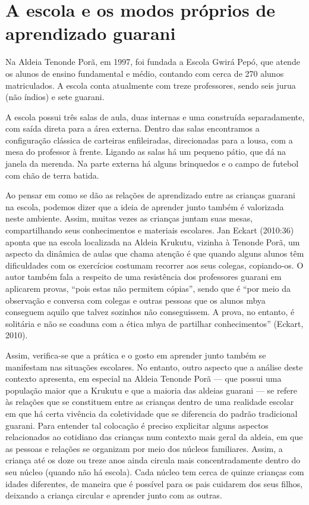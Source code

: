 \section{A escola e os modos próprios de aprendizado guarani}

Na Aldeia Tenonde Porã, em 1997, foi fundada a Escola Gwirá Pepó, que
atende os alunos de ensino fundamental e médio, contando com cerca de
270 alunos matriculados. A escola conta atualmente com treze
professores, sendo seis jurua (não índios) e sete guarani.

A escola possui três salas de aula, duas internas e uma construída
separadamente, com saída direta para a área externa. Dentro das salas
encontramos a configuração clássica de carteiras enfileiradas,
direcionadas para a lousa, com a mesa do professor à frente. Ligando as
salas há um pequeno pátio, que dá na janela da merenda. Na parte
externa há alguns brinquedos e o campo de futebol com chão de terra
batida. 

Ao pensar em como se dão as relações de aprendizado entre as crianças
guarani na escola, podemos dizer que a ideia de aprender junto também é
valorizada neste ambiente. Assim, muitas vezes as crianças juntam suas
mesas, compartilhando seus conhecimentos e materiais escolares. Jan
Eckart (2010:36) aponta que na escola localizada na Aldeia Krukutu,
vizinha à Tenonde Porã, um aspecto da dinâmica de aulas que chama
atenção é que quando alguns alunos têm dificuldades com os exercícios
costumam recorrer aos seus colegas, copiando-os. O autor também fala a
respeito de uma resistência dos professores guarani em aplicarem
provas, ``pois estas não permitem cópias'', sendo que é ``por meio da
observação e conversa com colegas e outras pessoas que os alunos mbya
conseguem aquilo que talvez sozinhos não conseguissem. A prova, no
entanto, é solitária e não se coaduna com a ética mbya de partilhar
conhecimentos'' (Eckart, 2010).

Assim, verifica-se que a prática e o gosto em aprender junto também se
manifestam nas situações escolares. No entanto, outro aspecto que a
análise deste contexto apresenta, em especial na Aldeia Tenonde Porã —
que possui uma população maior que a Krukutu e que a maioria das
aldeias guarani — se refere às relações que se constituem entre as
crianças dentro de uma realidade escolar em que há certa vivência da
coletividade que se diferencia do padrão tradicional guarani. Para
entender tal colocação é preciso explicitar alguns aspectos
relacionados ao cotidiano das crianças num contexto mais geral da
aldeia, em que as pessoas e relações se organizam por meio dos núcleos
familiares. Assim, a criança até os doze ou treze anos ainda circula
mais concentradamente dentro do seu núcleo (quando não há escola). Cada
núcleo tem cerca de quinze crianças com idades diferentes, de maneira
que é possível para os pais cuidarem dos seus filhos, deixando a criança
circular e aprender junto com as outras.

